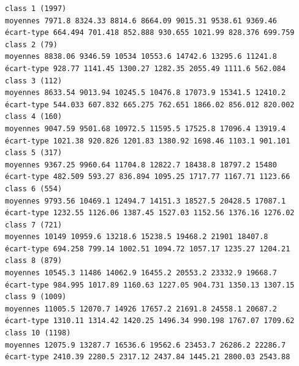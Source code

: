 \documentclass[environments,article,submit,pdftex,moreauthors]{Definitions/mdpi}
\begin{document}
\begin{scriptsize}
\begin{verbatim}
class 1 (1997)
moyennes 7971.8 8324.33 8814.6 8664.09 9015.31 9538.61 9369.46
écart-type 664.494 701.418 852.888 930.655 1021.99 828.376 699.759
class 2 (79)
moyennes 8838.06 9346.59 10534 10553.6 14742.6 13295.6 11241.8
écart-type 928.77 1141.45 1300.27 1282.35 2055.49 1111.6 562.084
class 3 (112)
moyennes 8633.54 9013.94 10245.5 10476.8 17073.9 15341.5 12410.2
écart-type 544.033 607.832 665.275 762.651 1866.02 856.012 820.002
class 4 (160)
moyennes 9047.59 9501.68 10972.5 11595.5 17525.8 17096.4 13919.4
écart-type 1021.38 920.826 1201.83 1380.92 1698.46 1103.1 901.101
class 5 (317)
moyennes 9367.25 9960.64 11704.8 12822.7 18438.8 18797.2 15480
écart-type 482.509 593.27 836.894 1095.25 1717.77 1167.71 1123.66
class 6 (554)
moyennes 9793.56 10469.1 12494.7 14151.3 18527.5 20428.5 17087.1
écart-type 1232.55 1126.06 1387.45 1527.03 1152.56 1376.16 1276.02
class 7 (721)
moyennes 10149 10959.6 13218.6 15238.5 19468.2 21901 18407.8
écart-type 694.258 799.14 1002.51 1094.72 1057.17 1235.27 1204.21
class 8 (879)
moyennes 10545.3 11486 14062.9 16455.2 20553.2 23332.9 19668.7
écart-type 984.995 1017.89 1160.63 1227.05 904.731 1350.13 1307.15
class 9 (1009)
moyennes 11005.5 12070.7 14926 17657.2 21691.8 24558.1 20687.2
écart-type 1310.11 1314.42 1420.25 1496.34 990.198 1767.07 1709.62
class 10 (1198)
moyennes 12075.9 13287.7 16536.6 19562.6 23453.7 26286.2 22286.7
écart-type 2410.39 2280.5 2317.12 2437.84 1445.21 2800.03 2543.88


\end{verbatim}
\end{scriptsize}
\end{document}
